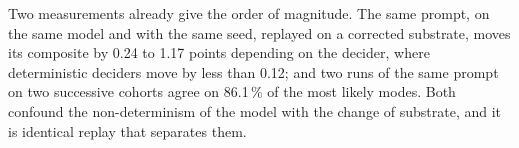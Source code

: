 Two measurements already give the order of magnitude. The same prompt, on the same model and with the same seed, replayed on a corrected substrate, moves its composite by 0.24 to 1.17 points depending on the decider, where deterministic deciders move by less than 0.12; and two runs of the same prompt on two successive cohorts agree on 86.1\,\% of the most likely modes. Both confound the non-determinism of the model with the change of substrate, and it is identical replay that separates them.

